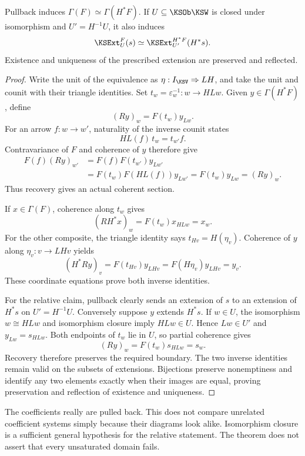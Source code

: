 \begin{KSproposition}\label{KS:KS37}
Pullback induces \(\Gamma(F)\simeq\Gamma(H^*F)\). If \(U\subseteq\KSOb\KSW\) is closed under isomorphism and \(U'=H^{-1}U\), it also induces
\[
 \KSExt_U^F(s)\simeq\KSExt_{U'}^{H^*F}(H^*s).
\]
Existence and uniqueness of the prescribed extension are preserved and reflected.
\end{KSproposition}
\begin{proof}
Write the unit of the equivalence as $\eta:I_\KSV\Rightarrow LH$, and take the unit and counit with their triangle identities. Set $t_w=\varepsilon_w^{-1}:w\to HLw$. Given $y\in\Gamma(H^*F)$, define
\[
 (Ry)_w=F(t_w)y_{Lw}.
\]
For an arrow $f:w\to w'$, naturality of the inverse counit states
\[
 HL(f)\,t_w=t_{w'}f.
\]
Contravariance of $F$ and coherence of $y$ therefore give
\[
\begin{aligned}
 F(f)(Ry)_{w'}
 &=F(f)F(t_{w'})y_{Lw'}\\
 &=F(t_w)F(HL(f))y_{Lw'}
 =F(t_w)y_{Lw}=(Ry)_w.
\end{aligned}
\]
Thus recovery gives an actual coherent section.

If $x\in\Gamma(F)$, coherence along $t_w$ gives
\[
 (RH^*x)_w=F(t_w)x_{HLw}=x_w.
\]
For the other composite, the triangle identity says $t_{Hv}=H(\eta_v)$. Coherence of $y$ along $\eta_v:v\to LHv$ yields
\[
 (H^*Ry)_v=F(t_{Hv})y_{LHv}=F(H\eta_v)y_{LHv}=y_v.
\]
These coordinate equations prove both inverse identities.

For the relative claim, pullback clearly sends an extension of $s$ to an extension of $H^*s$ on $U'=H^{-1}U$. Conversely suppose $y$ extends $H^*s$. If $w\in U$, the isomorphism $w\cong HLw$ and isomorphism closure imply $HLw\in U$. Hence $Lw\in U'$ and $y_{Lw}=s_{HLw}$. Both endpoints of $t_w$ lie in $U$, so partial coherence gives
\[
 (Ry)_w=F(t_w)s_{HLw}=s_w.
\]
Recovery therefore preserves the required boundary. The two inverse identities remain valid on the subsets of extensions. Bijections preserve nonemptiness and identify any two elements exactly when their images are equal, proving preservation and reflection of existence and uniqueness.
\end{proof}
The coefficients really are pulled back. This does not compare unrelated coefficient systems simply because their diagrams look alike. Isomorphism closure is a sufficient general hypothesis for the relative statement. The theorem does not assert that every unsaturated domain fails.

